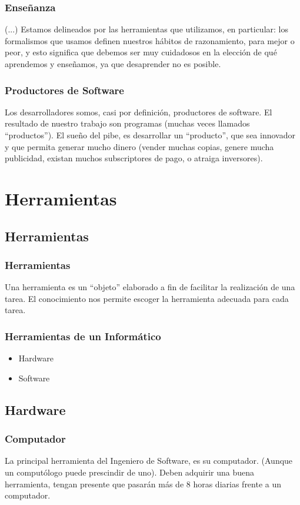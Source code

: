 \documentclass[12pt]{beamer}
\begin{document}
\begin{frame}
 \frametitle{Enseñanza}
 (...) Estamos delineados por las herramientas que utilizamos, en particular: los formalismos que usamos definen nuestros hábitos de razonamiento, para mejor o peor, y esto significa que debemos ser muy cuidadosos en la elección de qué aprendemos y enseñamos, ya que desaprender no es posible.
 \newline
\end{frame}


\begin{frame}
 \frametitle{Productores de Software}
 Los desarrolladores somos, casi por definición, productores de software. El resultado de nuestro trabajo son \alert{programas} (muchas veces llamados ``productos''). El sueño del pibe, es desarrollar un ``producto'', que sea innovador y que permita generar mucho dinero (vender muchas copias, genere mucha publicidad, existan muchos subscriptores de pago, o atraiga inversores).
\end{frame}


\section{Herramientas}
\subsection{Herramientas}

\begin{frame}
 \frametitle{Herramientas}
 Una herramienta es un ``objeto'' elaborado a fin de facilitar la realización de una tarea.
 \pause
 El \alert{conocimiento} nos permite escoger la herramienta adecuada para cada tarea.
\end{frame}


\begin{frame}
 \frametitle{Herramientas de un Informático}
 \begin{itemize}
  \item<2-> Hardware
  \item<3-> Software
 \end{itemize}
\end{frame}


\subsection{Hardware}

\begin{frame}
 \frametitle{Computador}
 La principal herramienta del Ingeniero de Software, es su \alert{computador}. (Aunque un computólogo puede prescindir de uno).
 \newline
 Deben adquirir una \alert{buena} herramienta, tengan presente que pasarán más de 8 horas diarias frente a un computador.
\end{frame}
\end{document}
